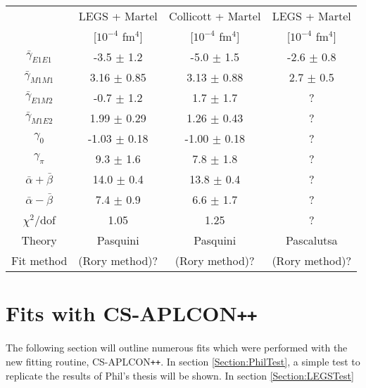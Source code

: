 \documentclass[]{article}
\begin{document}
\begin{table}[h!]
	\centering %
	\begin{tabular}{|c|c|c|c|} %
		\hline %
		& LEGS + Martel & Collicott + Martel & LEGS + Martel\\
		& [$10^{-4}$ fm$^{4}$] & [$10^{-4}$ fm$^{4}$] & [$10^{-4}$ fm$^{4}$]\\
		\hline\hline
		$\bar{\gamma}_{E1E1}$ & -3.5 $\pm$ 1.2 				& -5.0 $\pm$ 1.5 \hspace{1mm} & -2.6 $\pm$ 0.8 \\
		$\bar{\gamma}_{M1M1}$ & \hspace{1mm}3.16 $\pm$ 0.85 	& 3.13 $\pm$ 0.88 & 2.7 $\pm$ 0.5 \\
		$\bar{\gamma}_{E1M2}$ & -0.7 $\pm$ 1.2 				& 1.7 $\pm$ 1.7 & ?\\
		$\bar{\gamma}_{M1E2}$ & \hspace{1mm}1.99 $\pm$ 0.29 	& 1.26 $\pm$ 0.43 & ?\\
		\hline
		$\gamma_{0}$ 	& -1.03 $\pm$ 0.18 				& -1.00 $\pm$ 0.18\hspace{1.5mm} & ?\\
		$\gamma_{\pi}$ 	& \hspace{1mm}9.3 $\pm$ 1.6 	& 7.8 $\pm$ 1.8 & ?\\%
		$\bar{\alpha} + \bar{\beta}$ & 14.0 $\pm$ 0.4 	& 13.8 $\pm$ 0.4\hspace{1mm} & ?\\
		$\bar{\alpha} - \bar{\beta}$ & \hspace{1mm}7.4 $\pm$ 0.9 	& 6.6 $\pm$ 1.7 & ?\\[0.5ex]
		\hline %
		$\chi^{2}$/dof & 1.05 & 1.25 & ?\\[0.5ex]
		\hline
		Theory & Pasquini & Pasquini & Pascalutsa\\[0.5ex]
		Fit method & (Rory method)? & (Rory method)? & (Rory method)? \\[0.5ex]
		\hline
	\end{tabular}
\end{table}
%

\section{Fits with CS-APLCON\texttt{++}}

The following section will outline numerous fits which were performed with the new fitting routine, CS-APLCON\texttt{++}. In section \ref{Section:PhilTest}, a simple test to replicate the results of Phil's thesis will be shown. In section \ref{Section:LEGSTest}
\end{document}
